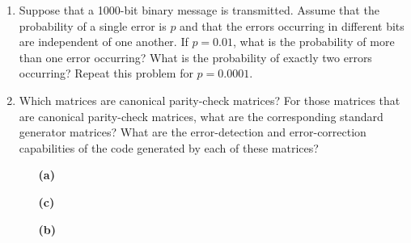 {\begin{enumerate}
 
\bf\item\rm
Suppose that a 1000-bit binary message is transmitted. Assume that the
probability of a single error is $p$ and that the errors occurring in
different bits are independent of one another. If $p = 0.01$, what is
the probability of more than one error occurring? What is the
probability of exactly two errors occurring?  Repeat this problem for
$p = 0.0001$.
 
 
\bf\item\rm
Which matrices are canonical parity-check matrices? For those matrices
that are canonical parity-check matrices, what are the corresponding
standard generator matrices? What are the error-detection and
error-correction capabilities of the code generated by each of these
matrices? 
 
 
\vspace{3pt}        %
 
\hspace{-7pt}
\begin{minipage}[t]{4.6in}
\noindent
\begin{minipage}[t]{2.25in}
\begin{itemize}
 
 \item[{\bf (a)}]
 
 \item[{\bf (c)}]
 
\end{itemize}
\end{minipage} \hfill
\begin{minipage}[t]{2.25in}
\begin{itemize}
 
 \item[{\bf (b)}]
 

\end{itemize}
\end{minipage}
\end{minipage}
\end{enumerate}}
